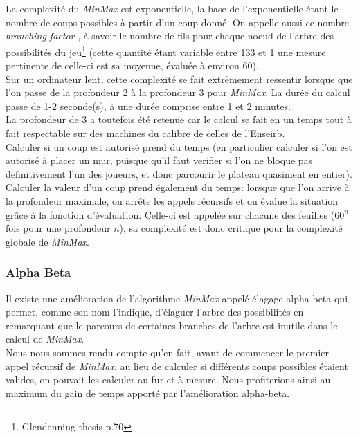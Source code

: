 \documentclass[12pt,a4paper]{article}
\begin{document}
La complexité du \textit{MinMax} est exponentielle, la base de l'exponentielle étant le 
nombre de coups possibles à partir d'un coup donné. On appelle aussi ce nombre 
\og \textit{branching factor} \fg{}, à savoir le nombre de fils pour chaque noeud de l'arbre des
possibilités du jeu\footnote{Glendenning thesis p.70} (cette quantité étant variable entre 133 et 1 une mesure pertinente de 
celle-ci est sa moyenne, évaluée à environ 60).\\

Sur un ordinateur lent, cette complexité se fait 
extr\^emement ressentir lorsque que l'on passe de la profondeur 2 à la profondeur 
3 pour \textit{MinMax}. La durée du calcul passe de 1-2 seconde(s), à une 
durée comprise entre 1 et 2 minutes.\\

La profondeur de 3 a toutefois été retenue car le calcul se fait en un temps tout 
à fait respectable sur des machines du calibre de celles de l'Enseirb.\\

Calculer si un coup est autorisé prend du temps (en particulier calculer si l'on 
est autorisé à placer un mur, puisque qu'il faut verifier si l'on ne bloque pas 
definitivement l'un des  joueurs, et donc parcourir le plateau quasiment en 
entier).\\

Calculer la valeur d'un coup prend également du temps: lorsque que l'on arrive à 
la profondeur maximale, on arrête les  appels récursifs et on évalue la 
situation gr\^ace à la fonction d'évaluation. Celle-ci est appelée sur chacune des 
feuilles ($60^n$ fois pour une profondeur $n$), sa complexité est donc critique 
pour la complexité globale de \textit{MinMax}.\\

\subsubsection{Alpha Beta}

Il existe une amélioration de l'algorithme \textit{MinMax} appelé \og élagage 
alpha-beta \fg{} qui 
permet, comme son nom l'indique, d'élaguer l'arbre des possibilités en 
remarquant que le parcours de certaines  branches de l'arbre est inutile dans le 
calcul de \textit{MinMax}. 
\\

Nous nous sommes rendu compte qu'en fait, avant de commencer le premier appel récursif de 
\textit{MinMax}, au lieu de calculer si différents 
coups possibles étaient valides, on pouvait les calculer au fur et à mesure. Nous
profiterions ainsi au maximum du  
gain de temps apporté par l'amélioration alpha-beta. \\
\end{document}
